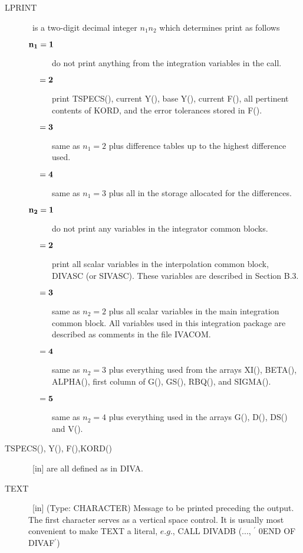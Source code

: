 \documentclass[twoside]{MATH77}
\begin{document}
\begin{description}
\item[LPRINT]  \ is a two-digit decimal integer $n_1n_2$ which determines
print as follows

\begin{description}
\item[$\bf n_1 = 1$]  do not print anything from the integration variables
in the call.

\item[$\bf \phantom{n_1}= 2$]  print TSPECS(), current Y(), base Y(),
current F(), all pertinent contents of KORD, and the error tolerances stored
in F().

\item[$\bf \phantom{n_1}= 3$]  same as $n_1=2$ plus difference tables up
to the highest difference used.

\item[$\bf \phantom{n_1}= 4$]  same as $n_1=3$ plus all in the storage
allocated for the differences.

\item[$\bf n_2 = 1$]  do not print any variables in the integrator common
blocks.

\item[$\bf \phantom{n_2}= 2$]  print all scalar variables in the
interpolation common block, DIVASC (or SIVASC).  These variables are
described in Section B.3.

\item[$\bf \phantom{n_2}= 3$]  same as $n_2=2$ plus all scalar variables in
the main integration common block.  All variables used in this
integration package are described as comments in the file IVACOM.

\item[$\bf \phantom{n_2}= 4$]  same as $n_2=3$ plus everything used from the
arrays XI(), BETA(), ALPHA(), first column of G(), GS(), RBQ(), and SIGMA().

\item[$\bf \phantom{n_2}= 5$]  same as $n_2=4$ plus everything used in the
arrays G(), D(), DS() and V().
\end{description}

\item[TSPECS(), Y(), F(),KORD()]  \ [in] are all defined as in DIVA.

\item[TEXT]  \ [in] (Type: CHARACTER) Message to be printed preceding the output.
The first character serves as a vertical space control. It is usually most
convenient to make TEXT a literal, $e.g.$, CALL DIVADB (..., $^{\prime }$%
0END OF DIVAF$^{\prime }$)
\end{description}
\end{document}
